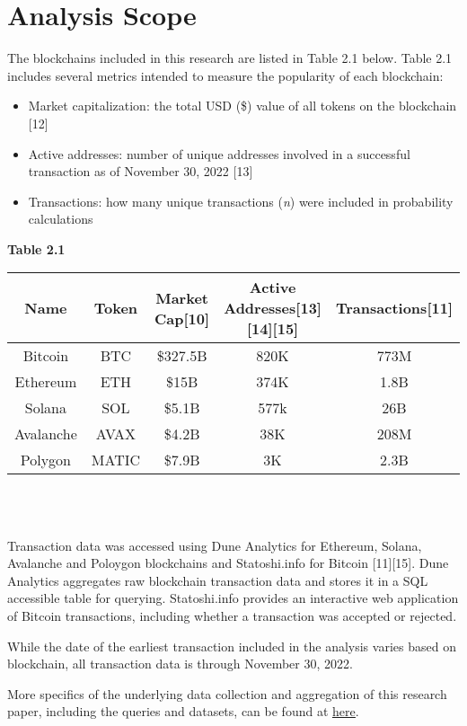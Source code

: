\documentclass[12pt]{article}
\begin{document}
\section{Analysis Scope}
The blockchains included in this research are listed in Table 2.1 below. Table 2.1 includes several metrics intended to measure the popularity of each blockchain:
\begin{itemize}
	\item Market capitalization: the total USD (\$) value of all tokens on the blockchain [12]
	\item Active addresses: number of unique addresses involved in a successful transaction as of November 30, 2022 [13] 
	\item Transactions: how many unique transactions (\emph{n}) were included in probability calculations \\
\end{itemize}
\textbf{Table 2.1}\\
\begin{tabular}{| c | c | c | c | c |}
\hline
\textbf{Name} & \textbf{Token} & \textbf{Market Cap}[10] & \textbf{Active Addresses}[13][14][15] & \textbf{Transactions}[11] \\
\hline
Bitcoin  & BTC & \$327.5B & 820K&773M\\
Ethereum & ETH & \$15B & 374K&1.8B\\
Solana & SOL & \$5.1B & 577k&26B\\
Avalanche & AVAX & \$4.2B & 38K& 208M \\
Polygon & MATIC & \$7.9B & 3K&2.3B\\
\hline
\end{tabular}\\
\\
\par Transaction data was accessed using Dune Analytics for Ethereum, Solana, Avalanche and Poloygon blockchains and Statoshi.info for Bitcoin [11][15]. Dune Analytics aggregates raw blockchain transaction data and stores it in a SQL accessible table for querying. Statoshi.info provides an interactive web application of Bitcoin transactions, including whether a transaction was accepted or rejected. 

While the date of the earliest transaction included in the analysis varies based on blockchain, all transaction data is through November 30, 2022.

More specifics of the underlying data collection and aggregation of this research paper, including the queries and datasets, can be found at \href{http://github.com/jamesomalley/EE104}{\underline{here}}.
\end{document}
